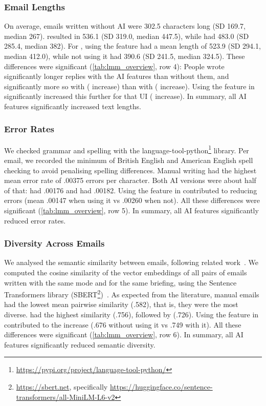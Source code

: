 \subsubsection{Email Lengths}\label{sec:results_lengths}

On average, emails written without AI were 302.5 characters long (SD 169.7, median 267).
\modemail{} resulted in 536.1 (SD 319.0, median 447.5), while \modeours{} had 483.0 (SD 285.4, median 382). For \modeours, using the \imppass{} feature had a mean length of 523.9 (SD 294.1, median 412.0), while not using it had 390.6 (SD 241.5, median 324.5).
These differences were significant (\cref{tab:lmm_overview}, row 4): People wrote significantly longer replies with the AI features than without them, and significantly more so with \modemail{} ( increase) than with \modeours{} ( increase). Using the \imppass{} feature in \modeours{} significantly increased this further for that UI ( increase). In summary, all AI features significantly increased text lengths.


\subsubsection{Error Rates}\label{sec:results_errors}
We checked grammar and spelling with the language-tool-python\footnote{\url{https://pypi.org/project/language-tool-python/}} library.
Per email, we recorded the minimum of British English and American English spell checking to avoid penalising spelling differences. %
Manual writing had the highest mean error rate of .00375 errors per character.  Both AI versions were about half of that: \modemail{} had .00176 and \modeours{} had .00182. Using the \imppass{} feature in \modeours{} contributed to reducing errors (mean .00147 when using it vs .00260 when not). All these differences were significant (\cref{tab:lmm_overview}, row 5). In summary, all AI features significantly reduced error rates.

\subsubsection{Diversity Across Emails}\label{sec:results_email_similarity}
We analysed the semantic similarity between emails, following related work~\cite{padmakumar2024diversity}. We computed the cosine similarity of the vector embeddings of all pairs of emails written with the same mode and for the same briefing, using the Sentence Transformers library (SBERT\footnote{\url{https://sbert.net}, specifically \url{https://huggingface.co/sentence-transformers/all-MiniLM-L6-v2}})~\cite{reimers2019sbert}.
As expected from the literature, manual emails had the lowest mean pairwise similarity (.582), that is, they were the most diverse. \modemail{} had the highest similarity (.756), followed by \modeours{} (.726). 
Using the \imppass{} feature in \modeours{} contributed to the increase (.676 without using it vs .749 with it). 
All these differences were significant (\cref{tab:lmm_overview}, row 6). In summary, all AI features significantly reduced semantic diversity.


